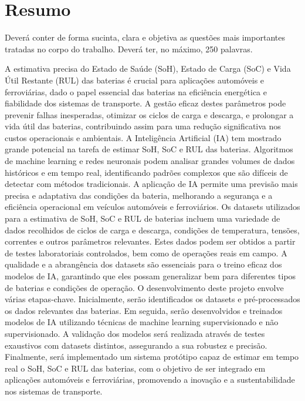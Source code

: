 

\renewcommand{\abstractname}{Resumo}
\markboth{\spacedlowsmallcaps{\abstractname}}{\spacedlowsmallcaps{\abstractname}}
\addcontentsline{toc}{chapter}{\abstractname}


\begingroup
\let\clearpage\relax
\let\cleardoublepage\relax

\chapter*{Resumo}
Deverá conter de forma sucinta, clara e objetiva as questões mais importantes tratadas no corpo do trabalho.\newline
Deverá ter, no máximo, 250 palavras.

A estimativa precisa do Estado de Saúde (SoH), Estado de Carga (SoC) e Vida Útil Restante (RUL) das baterias é crucial para aplicações automóveis e ferroviárias, dado o papel essencial das baterias na eficiência energética e fiabilidade dos sistemas de transporte.
A gestão eficaz destes parâmetros pode prevenir falhas inesperadas, otimizar os ciclos de carga e descarga, e prolongar a vida útil das baterias, contribuindo assim para uma redução significativa nos custos operacionais e ambientais. 
A Inteligência Artificial (IA) tem mostrado grande potencial na tarefa de estimar SoH, SoC e RUL das baterias. Algoritmos de machine learning e redes neuronais podem analisar grandes volumes de dados históricos e em tempo real, identificando padrões complexos que são difíceis de detectar com métodos tradicionais. 
A aplicação de IA permite uma previsão mais precisa e adaptativa das condições da bateria, melhorando a segurança e a eficiência operacional em veículos automóveis e ferroviários. Os datasets utilizados para a estimativa de SoH, SoC e RUL de baterias incluem uma variedade de dados recolhidos de ciclos de carga e descarga, condições de temperatura, tensões, correntes e outros parâmetros relevantes. 
Estes dados podem ser obtidos a partir de testes laboratoriais controlados, bem como de operações reais em campo. A qualidade e a abrangência dos datasets são essenciais para o treino eficaz dos modelos de IA, garantindo que eles possam generalizar bem para diferentes tipos de baterias e condições de operação. O desenvolvimento deste projeto envolve várias etapas-chave. 
Inicialmente, serão identificados os datasets e pré-processados os dados relevantes das baterias. Em seguida, serão desenvolvidos e treinados modelos de IA utilizando técnicas de machine learning supervisionado e não supervisionado. A validação dos modelos será realizada através de testes exaustivos com datasets distintos, assegurando a sua robustez e precisão. 
Finalmente, será implementado um sistema protótipo capaz de estimar em tempo real o SoH, SoC e RUL das baterias, com o objetivo de ser integrado em aplicações automóveis e ferroviárias, promovendo a inovação e a sustentabilidade nos sistemas de transporte.\\




